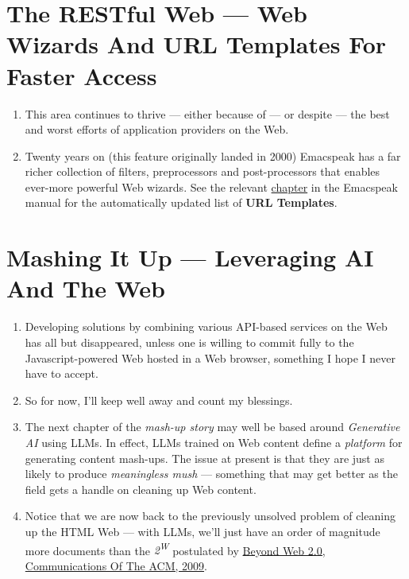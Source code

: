 \documentclass[11pt]{article}
\begin{document}
\section{The RESTful Web —  Web Wizards And URL Templates For Faster Access}
\label{sec:orgb213825}

\begin{enumerate}
\item This area continues to thrive --- either because of --- or
despite --- the best and worst efforts of application providers on the
Web.
\item Twenty years on (this feature originally landed in 2000)
Emacspeak has a far richer collection of filters, preprocessors
and post-processors
 that enables ever-more powerful Web
wizards. See the relevant \href{https://tvraman.github.io/emacspeak/manual/URL-Templates.html}{chapter} in the Emacspeak manual for the
automatically updated list of \textbf{URL Templates}.
\end{enumerate}
\section{Mashing It Up —  Leveraging  AI And The Web}
\label{sec:orgd904f21}

\begin{enumerate}
\item Developing solutions by combining various API-based services on
the Web has all but disappeared, unless one is willing to commit
fully to the Javascript-powered Web hosted in a Web browser,
something I hope I never have to accept.
\item So for now, I'll keep
well away and count my blessings.
\item The next chapter of the \emph{mash-up story} may well be based around
 \emph{Generative AI} using LLMs. In effect, LLMs trained on   Web content 
define a \emph{platform} for generating content mash-ups.  The issue
at present is that they are just as  likely  to produce
\emph{meaningless mush} ---
something that may  get better as the field gets a
handle on cleaning up  Web content.
\item Notice that we are now back to the previously unsolved problem
of cleaning up the  HTML Web --- with LLMs, we'll just
have an order of magnitude more documents than the \emph{2\textsuperscript{W}} postulated
 by  \href{https://emacspeak.sourceforge.net/raman/publications/beyond-web20-cacm-2009/}{Beyond Web 2.0, Communications
Of The ACM, 2009}.
\end{enumerate}
\end{document}
